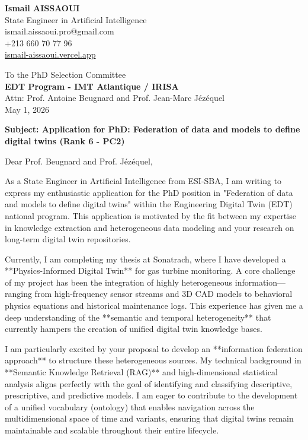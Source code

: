 \documentclass[a4paper,12pt]{article}
\begin{document}
\begin{flushleft}
    \textbf{Ismail AISSAOUI} \\
    State Engineer in Artificial Intelligence \\
    ismail.aissaoui.pro@gmail.com \\
    +213 660 70 77 96 \\
    \href{https://ismail-aissaoui.vercel.app}{ismail-aissaoui.vercel.app}
\end{flushleft}

\begin{flushright}
    To the PhD Selection Committee \\
    \textbf{EDT Program - IMT Atlantique / IRISA} \\
    Attn: Prof. Antoine Beugnard and Prof. Jean-Marc Jézéquel \\
    \medskip
    May 1, 2026
\end{flushright}

\bigskip

\noindent \textbf{Subject: Application for PhD: Federation of data and models to define digital twins (Rank 6 - PC2)}

\bigskip

Dear Prof. Beugnard and Prof. Jézéquel,

As a State Engineer in Artificial Intelligence from ESI-SBA, I am writing to express my enthusiastic application for the PhD position in "Federation of data and models to define digital twins" within the Engineering Digital Twin (EDT) national program. This application is motivated by the fit between my expertise in knowledge extraction and heterogeneous data modeling and your research on long-term digital twin repositories.

Currently, I am completing my thesis at Sonatrach, where I have developed a **Physics-Informed Digital Twin** for gas turbine monitoring. A core challenge of my project has been the integration of highly heterogeneous information—ranging from high-frequency sensor streams and 3D CAD models to behavioral physics equations and historical maintenance logs. This experience has given me a deep understanding of the **semantic and temporal heterogeneity** that currently hampers the creation of unified digital twin knowledge bases.

I am particularly excited by your proposal to develop an **information federation approach** to structure these heterogeneous sources. My technical background in **Semantic Knowledge Retrieval (RAG)** and high-dimensional statistical analysis aligns perfectly with the goal of identifying and classifying descriptive, prescriptive, and predictive models. I am eager to contribute to the development of a unified vocabulary (ontology) that enables navigation across the multidimensional space of time and variants, ensuring that digital twins remain maintainable and scalable throughout their entire lifecycle.
\end{document}
